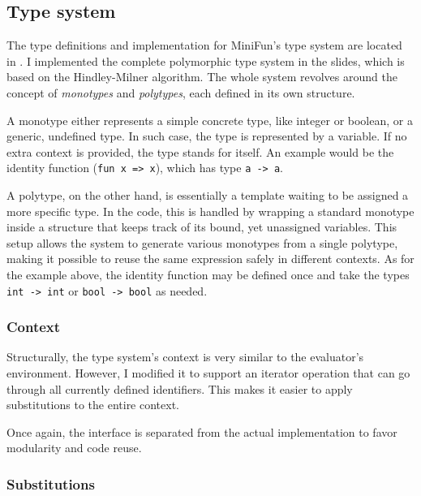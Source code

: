 \documentclass[12pt]{article}
\newcommand{\Code}[1]{\texttt{#1}}
\begin{document}

\subsection{Type system}

The type definitions and implementation for MiniFun's type system are located in
. I implemented the complete polymorphic
type system in the slides, which is based on the Hindley-Milner algorithm. The
whole system revolves around the concept of \textit{monotypes} and
\textit{polytypes}, each defined in its own structure.

A monotype either represents a simple concrete type, like integer or boolean, or
a generic, undefined type. In such case, the type is represented by a variable.
If no extra context is provided, the type stands for itself. An example would be
the identity function (\Code{fun x => x}), which has type \Code{a -> a}.

A polytype, on the other hand, is essentially a template waiting to be assigned
a more specific type. In the code, this is handled by wrapping a standard
monotype inside a structure that keeps track of its bound, yet unassigned
variables. This setup allows the system to generate various monotypes from a
single polytype, making it possible to reuse the same expression safely in
different contexts. As for the example above, the identity function may be
defined once and take the types \Code{int -> int} or \Code{bool -> bool} as
needed.

\subsubsection{Context}

Structurally, the type system's context is very similar to the evaluator's
environment. However, I modified it to support an iterator operation that
can go through all currently defined identifiers. This makes it easier to apply
substitutions to the entire context.

Once again, the interface is separated from the actual implementation to favor
modularity and code reuse.

\subsubsection{Substitutions}
\end{document}
